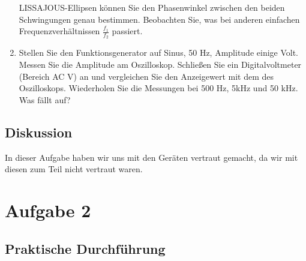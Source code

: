 \documentclass[12pt]{scrartcl}
\begin{document}
\begin{enumerate}
LISSAJOUS-Ellipsen können Sie den Phasenwinkel zwischen den beiden Schwingungen genau bestimmen. Beobachten Sie, was bei anderen einfachen Frequenzverhältnissen $\frac{f_1}{f_2}$ passiert.
\item
Stellen Sie den Funktionsgenerator auf Sinus, 50 Hz, Amplitude einige Volt. Messen Sie die Amplitude am Oszilloskop. Schließen Sie ein Digitalvoltmeter (Bereich AC V) an und vergleichen Sie den Anzeigewert mit dem des Oszilloskops. Wiederholen Sie die Messungen bei 500 Hz, 5kHz und 50 kHz. Was fällt auf?
\end{enumerate}
\subsection{Diskussion}
In dieser Aufgabe haben wir uns mit den Geräten vertraut gemacht, da wir mit diesen zum Teil nicht vertraut waren.
\section{Aufgabe 2}
\subsection{Praktische Durchführung}
\end{document}
